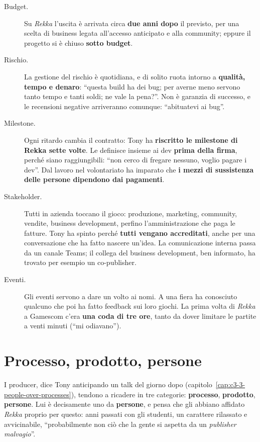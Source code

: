 \begin{description}
  \item[Budget.] Su \emph{Rekka} l'uscita è arrivata circa \textbf{due anni dopo}
        il previsto, per una scelta di business legata all'accesso anticipato e
        alla community; eppure il progetto si è chiuso \textbf{sotto budget}.
  \item[Rischio.] La gestione del rischio è quotidiana, e di solito ruota intorno a
        \textbf{qualità, tempo e denaro}: ``questa build ha dei bug; per averne
        meno servono tanto tempo e tanti soldi; ne vale la pena?''. Non è garanzia
        di successo, e le recensioni negative arriveranno comunque: ``abituatevi ai
        bug''.
  \item[Milestone.] Ogni ritardo cambia il contratto: Tony ha \textbf{riscritto
        le milestone di Rekka sette volte}. Le definisce insieme ai dev
        \textbf{prima della firma}, perché siano raggiungibili: ``non cerco di
        fregare nessuno, voglio pagare i dev''. Dal lavoro nel volontariato ha
        imparato che \textbf{i mezzi di sussistenza delle persone dipendono dai
        pagamenti}.
  \item[Stakeholder.] Tutti in azienda toccano il gioco: produzione, marketing,
        community, vendite, business development, perfino l'amministrazione che
        paga le fatture. Tony ha spinto perché \textbf{tutti vengano accreditati},
        anche per una conversazione che ha fatto nascere un'idea. La comunicazione
        interna passa da un canale Teams; il collega del business development, ben
        informato, ha trovato per esempio un co-publisher.
  \item[Eventi.] Gli eventi servono a dare un volto ai nomi. A una fiera ha
        conosciuto qualcuno che poi ha fatto feedback sui loro giochi. La prima
        volta di \emph{Rekka} a Gamescom c'era \textbf{una coda di tre ore}, tanto
        da dover limitare le partite a venti minuti (``mi odiavano'').
\end{description}

\section{Processo, prodotto, persone}
\label{sec:c2-2-persone}

I producer, dice Tony anticipando un talk del giorno dopo
(capitolo~\ref{cap:c3-3-people-over-processes}), tendono a ricadere in tre
categorie: \textbf{processo}, \textbf{prodotto}, \textbf{persone}. Lui è decisamente
uno da \textbf{persone}, e pensa che gli abbiano affidato \emph{Rekka} proprio per
questo: anni passati con gli studenti, un carattere rilassato e avvicinabile,
``probabilmente non ciò che la gente si aspetta da un \emph{publisher
malvagio}''.


